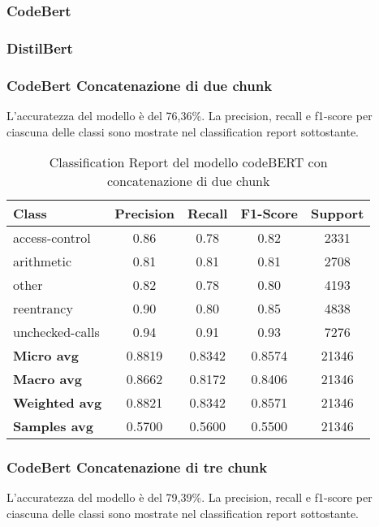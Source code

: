 \documentclass[../../Thesis.tex]{subfiles}
\begin{document}
\subsubsection{CodeBert}

\subsubsection{DistilBert}
\subsubsection{CodeBert Concatenazione di due chunk}
L'accuratezza del modello è del 76,36\%. La precision, recall e f1-score per ciascuna delle classi sono mostrate nel classification report sottostante.

\begin{table}[H]
\centering
\small
\begin{tabular}{lcccc}
\hline
\textbf{Class} & \textbf{Precision} & \textbf{Recall} & \textbf{F1-Score} & \textbf{Support} \\
\hline
access-control & 0.86 & 0.78 & 0.82 & 2331 \\
arithmetic & 0.81 & 0.81 & 0.81 & 2708 \\
other & 0.82 & 0.78 & 0.80 & 4193 \\
reentrancy & 0.90 & 0.80 & 0.85 & 4838 \\
unchecked-calls & 0.94 & 0.91 & 0.93 & 7276 \\
\hline
\textbf{Micro avg} & 0.8819 & 0.8342 & 0.8574 & 21346 \\
\textbf{Macro avg} & 0.8662 & 0.8172 & 0.8406 & 21346 \\
\textbf{Weighted avg} & 0.8821 & 0.8342 & 0.8571 & 21346 \\
\textbf{Samples avg} & 0.5700 & 0.5600 & 0.5500 & 21346 \\
\hline
\end{tabular}
\caption{Classification Report del modello codeBERT con concatenazione di due chunk}
\end{table}
\subsubsection{CodeBert Concatenazione di tre chunk}
L'accuratezza del modello è del 79,39\%. La precision, recall e f1-score per ciascuna delle classi sono mostrate nel classification report sottostante.
\end{document}
